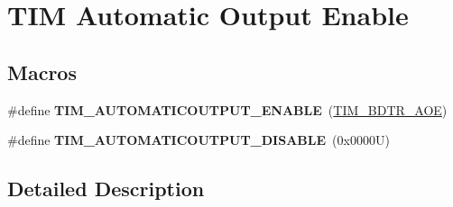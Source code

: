 \hypertarget{group___t_i_m___a_o_e___bit___set___reset}{}\section{T\+IM Automatic Output Enable}
\label{group___t_i_m___a_o_e___bit___set___reset}
\subsection*{Macros}
\begin{DoxyCompactItemize}
\item 
\mbox{\label{group___t_i_m___a_o_e___bit___set___reset_ga09e7f3f768b0f122f13fd47771f07ddf}} 
\#define {\bfseries T\+I\+M\+\_\+\+A\+U\+T\+O\+M\+A\+T\+I\+C\+O\+U\+T\+P\+U\+T\+\_\+\+E\+N\+A\+B\+LE}~(\hyperlink{group___peripheral___registers___bits___definition_ga59f15008050f91fa3ecc9eaaa971a509}{T\+I\+M\+\_\+\+B\+D\+T\+R\+\_\+\+A\+OE})
\item 
\mbox{\label{group___t_i_m___a_o_e___bit___set___reset_ga65b4336dee767fbe8d8cc4f980f6b18e}} 
\#define {\bfseries T\+I\+M\+\_\+\+A\+U\+T\+O\+M\+A\+T\+I\+C\+O\+U\+T\+P\+U\+T\+\_\+\+D\+I\+S\+A\+B\+LE}~(0x0000\+U)
\end{DoxyCompactItemize}


\subsection{Detailed Description}

